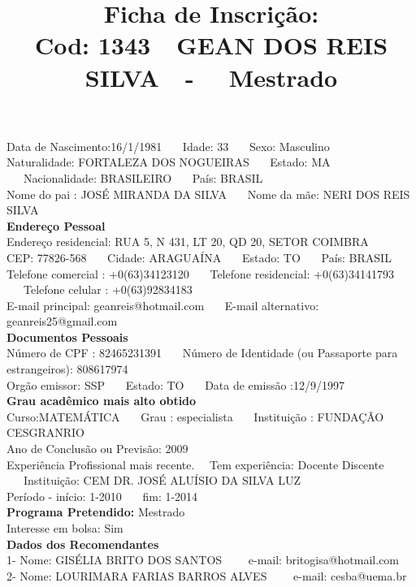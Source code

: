 \documentclass[11pt]{article}
\title{\vspace*{-4cm} Ficha de Inscrição: \\Cod: 1343\ \ GEAN DOS REIS SILVA\ \ - \ \ Mestrado 
 }
\date{}
\begin{document}
\maketitle
\vspace*{-1.5cm}
\noindent Data de Nascimento:16/1/1981
\ \ \ Idade: 33   \ \ \ Sexo: Masculino
\\
Naturalidade: FORTALEZA DOS NOGUEIRAS  
\ \ \  Estado: MA
\ \ \  Nacionalidade: BRASILEIRO
\ \ \ País: BRASIL
\\        
Nome do pai : JOSÉ MIRANDA DA SILVA
\ \ \ Nome da mãe: NERI DOS REIS SILVA          
\\[0.2cm]                     
\textbf{Endereço Pessoal} 
\\ 
\noindent Endereço residencial: RUA 5, N 431, LT 20, QD 20, SETOR COIMBRA
\\
        CEP: 77826-568 
\ \ \ Cidade: ARAGUAÍNA 
\ \ \ Estado: TO 
\ \ \ País: BRASIL
\\		
		Telefone comercial : +0(63)34123120
\ \ \ Telefone residencial: +0(63)34141793
\ \ \ Telefone celular : +0(63)92834183
\\
E-mail principal: geanreis@hotmail.com
\ \ \ E-mail alternativo: geanreis25@gmail.com 
\\[0.2cm] 
\textbf{Documentos Pessoais}
\\
\noindent Número de CPF : 82465231391
\ \ \ Número de Identidade (ou Passaporte para estrangeiros): 808617974
\\
Orgão emissor: SSP
\ \ \ Estado: TO
\ \ \ Data de emissão :12/9/1997
\\[0.3cm]
\textbf{Grau acadêmico mais alto obtido}
\\	
Curso:MATEMÁTICA
\ \ \ Grau : especialista
\ \ \ Instituição : FUNDAÇÃO CESGRANRIO
\\			
Ano de Conclusão ou Previsão: 2009
\\ 
Experiência Profissional mais recente. \ \  
Tem experiência: Docente Discente  
\ \ \ Instituição: CEM DR. JOSÉ ALUÍSIO DA SILVA LUZ
\\  
Período - início: 1-2010
\ \ \ fim: 1-2014
\\[0.2cm] 
\textbf{Programa Pretendido:} Mestrado\\
Interesse em bolsa: Sim
\\[0.3cm]		
\textbf{Dados dos Recomendantes} 
\\
1- Nome: GISÉLIA BRITO DOS SANTOS
\ \ \ \  e-mail: britogisa@hotmail.com 
\\
2- Nome: LOURIMARA FARIAS BARROS ALVES
\ \ \ \ e-mail: cesba@uema.br
\end{document}

